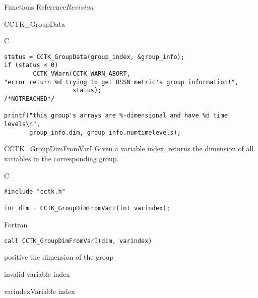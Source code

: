 \begin{cactuspart}{ Functions Reference}{}{$Revision$}
\begin{FunctionDescription}{CCTK\_GroupData}
\begin{ExampleSection}
\begin{Example}{C}
\begin{verbatim}
status = CCTK_GroupData(group_index, &group_info);
if (status < 0)
        CCTK_VWarn(CCTK_WARN_ABORT,
"error return %d trying to get BSSN metric's group information!",
                   status);                                     /*NOTREACHED*/

printf("this group's arrays are %-dimensional and have %d time levels\n",
       group_info.dim, group_info.numtimelevels);
\end{verbatim}
\end{Example}
\end{ExampleSection}
\end{FunctionDescription}


\begin{FunctionDescription}{CCTK\_GroupDimFromVarI}
\label{CCTK-GroupDimFromVarI}
Given a variable index, returns the dimension of all variables in the corresponding group.

\begin{SynopsisSection}
\begin{Synopsis}{C}
\begin{verbatim}
#include "cctk.h"

int dim = CCTK_GroupDimFromVarI(int varindex);
\end{verbatim}
\end{Synopsis}
\begin{Synopsis}{Fortran}
\begin{verbatim}
call CCTK_GroupDimFromVarI(dim, varindex)
\end{verbatim}
\end{Synopsis}
\end{SynopsisSection}

\begin{ResultSection}
\begin{Result}{positive} the dimension of the group\end{Result}
\begin{Result}{-1} invalid variable index \end{Result}
\end{ResultSection}

\begin{ParameterSection}
\begin{Parameter}{varindex}Variable index\end{Parameter}
\end{ParameterSection}


\end{FunctionDescription}
\end{cactuspart}
